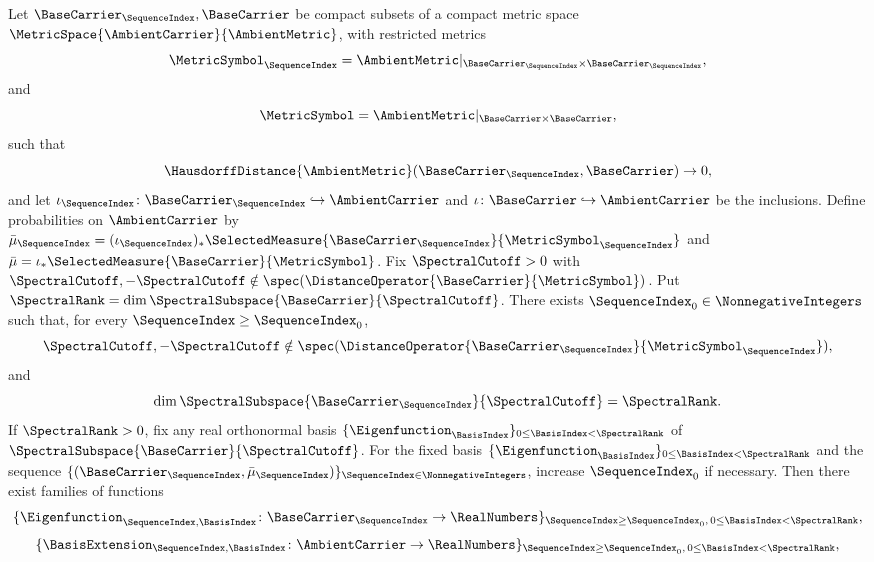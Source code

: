 \begin{theorem}\label{lem:spectral-continuity}
Let
$\BaseCarrier _\SequenceIndex ,\BaseCarrier $
be compact subsets of a compact metric space
$\MetricSpace{\AmbientCarrier }{\AmbientMetric }$,
with restricted metrics
\[
 \MetricSymbol_\SequenceIndex=\AmbientMetric|_{\BaseCarrier_\SequenceIndex\times\BaseCarrier_\SequenceIndex},
\]
and
\[
 \MetricSymbol=\AmbientMetric|_{\BaseCarrier\times\BaseCarrier},
\]
such that
\[
 \HausdorffDistance{\AmbientMetric }(\BaseCarrier _\SequenceIndex ,\BaseCarrier )\to0,
\]
and let $\iota_\SequenceIndex\colon\BaseCarrier_\SequenceIndex\hookrightarrow\AmbientCarrier$
and $\iota\colon\BaseCarrier\hookrightarrow\AmbientCarrier$ be the inclusions.
Define probabilities on $\AmbientCarrier$ by
$\bar\mu_\SequenceIndex=(\iota_\SequenceIndex)_*\SelectedMeasure{\BaseCarrier_\SequenceIndex}{\MetricSymbol_\SequenceIndex}$
and $\bar\mu=\iota_*\SelectedMeasure{\BaseCarrier}{\MetricSymbol}$.
Fix
$\SpectralCutoff >0$
with
$\SpectralCutoff ,-\SpectralCutoff \notin\spec(\DistanceOperator{\BaseCarrier}{\MetricSymbol})$.
Put
$\SpectralRank=\dim\SpectralSubspace{\BaseCarrier}{\SpectralCutoff}$.
There exists $\SequenceIndex_0\in\NonnegativeIntegers$ such that, for every
$\SequenceIndex\geq\SequenceIndex_0$,
\begin{equation}\label{eq:stable-spectral-endpoints}
 \SpectralCutoff,-\SpectralCutoff
 \notin\spec(\DistanceOperator{\BaseCarrier_\SequenceIndex}{\MetricSymbol_\SequenceIndex}),
\end{equation}
and
\begin{equation}\label{eq:stable-spectral-rank}
 \dim\SpectralSubspace{\BaseCarrier_\SequenceIndex}{\SpectralCutoff}
 =\SpectralRank.
\end{equation}
If
$\SpectralRank>0$,
fix any real orthonormal basis
$\{\Eigenfunction_\BasisIndex\}_{0\leq\BasisIndex<\SpectralRank}$
of
$\SpectralSubspace{\BaseCarrier}{\SpectralCutoff}$.
For the fixed basis
$\{\Eigenfunction_\BasisIndex\}_{0\leq\BasisIndex<\SpectralRank}$
and the sequence
$\{(\BaseCarrier_\SequenceIndex,\bar\mu_\SequenceIndex)\}_{\SequenceIndex\in\NonnegativeIntegers}$,
increase
$\SequenceIndex_0$
if necessary.
Then there exist families of functions
\[
 \{\Eigenfunction_{\SequenceIndex,\BasisIndex}
   \colon\BaseCarrier_\SequenceIndex\to\RealNumbers\}_{\SequenceIndex\geq\SequenceIndex_0,\,0\leq\BasisIndex<\SpectralRank},
\]
\[
 \{\BasisExtension_{\SequenceIndex,\BasisIndex}
   \colon\AmbientCarrier\to\RealNumbers\}_{\SequenceIndex\geq\SequenceIndex_0,\,0\leq\BasisIndex<\SpectralRank},
\]
\end{theorem}
